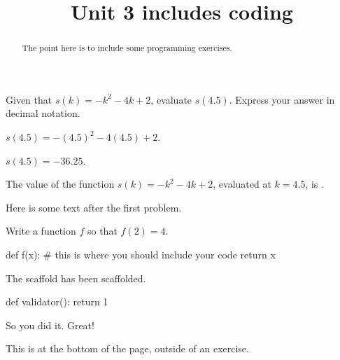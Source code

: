 \documentclass{ximera}
\title{Unit 3 includes coding}
\begin{document}
\begin{abstract}
  The point here is to include some programming exercises.
\end{abstract}

\begin{exercise}
Given that $s(k)=-k^2-4 k+2$, evaluate $s(4.5)$. Express your answer in decimal notation.
\begin{solution}
\begin{hint}
$s(4.5)=-(4.5)^2-4 (4.5)+2$.
\end{hint}
\begin{hint}
$s(4.5)=-36.25$.
\end{hint}
The value of the function $s(k)=-k^2-4 k+2$, evaluated at $k=4.5$, is .
\end{solution}

Here is some text after the first problem.
\end{exercise}

\begin{exercise}
Write a function $f$ so that $f(2) = 4$.

\begin{solution}
\begin{python-scaffold}
  def f(x):
    # this is where you should include your code
    return x
\end{python-scaffold}

The scaffold has been scaffolded.

\begin{python-validator}
  def validator():
    return 1
\end{python-validator}
\end{solution}

So you did it.  Great!
\end{exercise}

This is at the bottom of the page, outside of an exercise.
\end{document}
